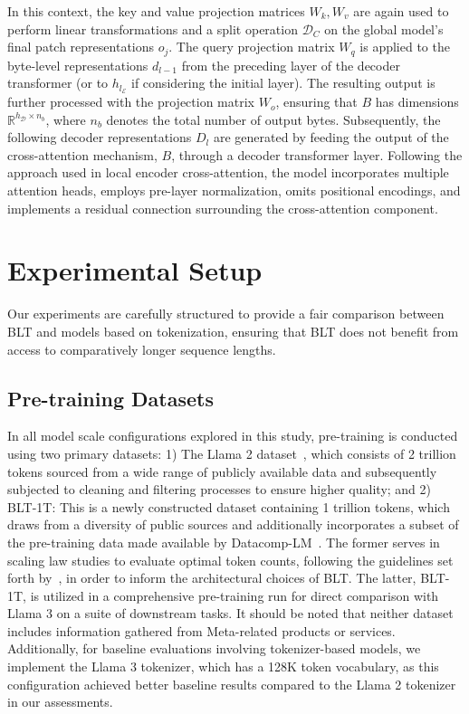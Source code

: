 In this context, the key and value projection matrices $W_k, W_v$ are again used to perform linear transformations and a split operation $\mathcal{D}_C$ on the global model’s final patch representations $o_j$. The query projection matrix $W_q$ is applied to the byte-level representations $d_{l-1}$ from the preceding layer of the decoder transformer (or to $h_{l_{\mathcal{E}}}$ if considering the initial layer). The resulting output is further processed with the projection matrix $W_o$, ensuring that $B$ has dimensions $\mathbb{R}^{h_{\mathcal{D}} \times n_b}$, where $n_b$ denotes the total number of output bytes. Subsequently, the following decoder representations $D_l$ are generated by feeding the output of the cross-attention mechanism, $B$, through a decoder transformer layer. Following the approach used in local encoder cross-attention, the model incorporates multiple attention heads, employs pre-layer normalization, omits positional encodings, and implements a residual connection surrounding the cross-attention component.

\section{Experimental Setup}
\label{section:experiments}
Our experiments are carefully structured to provide a fair comparison between {\textsc BLT} and models based on tokenization, ensuring that {\textsc BLT} does not benefit from access to comparatively longer sequence lengths.

\subsection{Pre-training Datasets} In all model scale configurations explored in this study, pre-training is conducted using two primary datasets: 1) The Llama 2 dataset~\citep{touvron2023llama}, which consists of 2 trillion tokens sourced from a wide range of publicly available data and subsequently subjected to cleaning and filtering processes to ensure higher quality; and 2) {\textsc BLT}-1T: This is a newly constructed dataset containing 1 trillion tokens, which draws from a diversity of public sources and additionally incorporates a subset of the pre-training data made available by Datacomp-LM~\citep{li2024datacomp}. The former serves in scaling law studies to evaluate optimal token counts, following the guidelines set forth by~\cite{dubey2024llama}, in order to inform the architectural choices of {\textsc BLT}. The latter, {\textsc BLT}-1T, is utilized in a comprehensive pre-training run for direct comparison with Llama 3 on a suite of downstream tasks. It should be noted that neither dataset includes information gathered from Meta-related products or services. Additionally, for baseline evaluations involving tokenizer-based models, we implement the Llama 3 tokenizer, which has a 128K token vocabulary, as this configuration achieved better baseline results compared to the Llama 2 tokenizer in our assessments.

